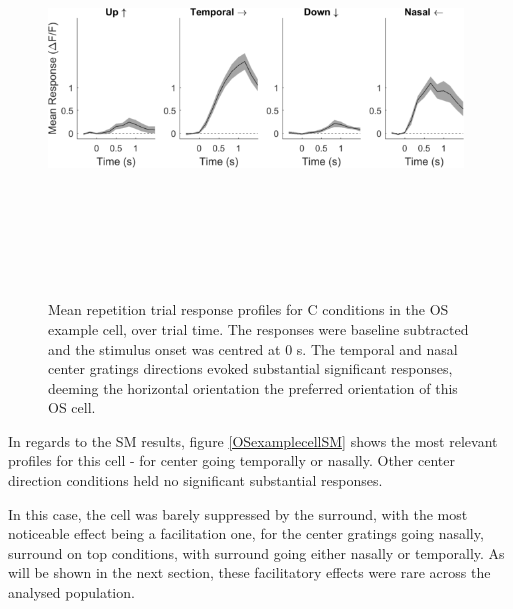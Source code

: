 \begin{figure}[H] \centering \includegraphics[width=11cm,height=11cm,keepaspectratio]{Figures/7.Results/individualSM/roi_46_mf379_pos2/1.png} 
\caption{Mean repetition trial response profiles for C conditions in the OS example cell, over trial time. The responses were baseline subtracted and the stimulus onset was centred at 0 s. The temporal and nasal center gratings directions evoked substantial significant responses, deeming the horizontal orientation the preferred orientation of this OS cell.}
\label{OSexamplecellcenter}
\end{figure}

In regards to the SM results, figure \ref{OSexamplecellSM} shows the most relevant profiles for this cell - for center going temporally or nasally. Other center direction conditions held no significant substantial  responses. 

In this case, the cell was barely suppressed by the surround, with the most noticeable effect being a facilitation one, for the center gratings going nasally, surround on top conditions, with surround going either nasally or temporally. As will be shown in the next section, these facilitatory effects were rare across the analysed population.

